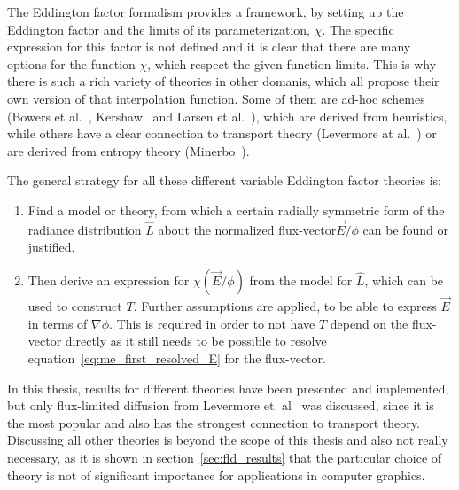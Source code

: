 The Eddington factor formalism provides a framework, by setting up the Eddington factor and the limits of its parameterization, $\chi$. The specific expression for this factor is not defined and it is clear that there are many options for the function $\chi$, which respect the given function limits. This is why there is such a rich variety of theories in other domanis, which all propose their own version of that interpolation function. Some of them are ad-hoc schemes (Bowers et al.~\cite{Bowers82}, Kershaw~\cite{Kershaw76} and Larsen et al.~\cite{Larsen74}), which are derived from heuristics, while others have a clear connection to transport theory (Levermore at al.~\cite{Levermore81}) or are derived from entropy theory (Minerbo~\cite{Minerbo78}).

The general strategy for all these different variable Eddington factor theories is:
\begin{enumerate}
\item Find a model or theory, from which a certain radially symmetric form of the radiance distribution $\hat{L}$ about the normalized flux-vector$\vec{E}/\phi$ can be found or justified.
\item Then derive an expression for $\chi(\vec{E}/\phi)$ from the model for $\hat{L}$, which can be used to construct $T$. Further assumptions are applied, to be able to express $\vec{E}$ in terms of $\nabla\phi$. This is required in order to not have $T$ depend on the flux-vector directly as it still needs to be possible to resolve equation~\ref{eq:me_first_resolved_E} for the flux-vector.
\end{enumerate}

In this thesis, results for different theories have been presented and implemented, but only flux-limited diffusion from Levermore et. al~\cite{Levermore81} was discussed, since it is the most popular and also has the strongest connection to transport theory. Discussing all other theories is beyond the scope of this thesis and also not really necessary, as it is shown in section~\ref{sec:fld_results} that the particular choice of theory is not of significant importance for applications in computer graphics.